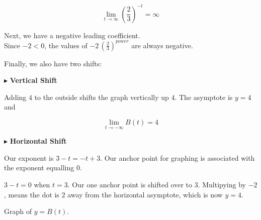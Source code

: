 \documentclass{ximera}
\begin{document}
\begin{example}
\begin{explanation}
\begin{model}
\[ \lim\limits_{t \to \infty} \left( \frac{2}{3} \right)^{-t} = \infty \]








\end{model}

Next, we have a negative leading coefficient. \\

Since $-2 < 0$, the values of $-2 \, \left( \frac{2}{3} \right)^{power}$ are always negative.



Finally, we also have two shifts:



$\blacktriangleright$ \textbf{\textcolor{blue!55!black}{Vertical Shift}} 

Adding $4$ to the outside shifts the graph vertically up $4$.  The asymptote is $y = 4$ and 

\[ \lim\limits_{t \to -\infty} B(t) = 4 \]




$\blacktriangleright$ \textbf{\textcolor{blue!55!black}{Horizontal Shift}} 

Our exponent is $3 - t = -t + 3$.  Our anchor point for graphing is associated with the exponent equalling $0$.



$3-t=0$ when $t=3$. Our one anchor point is shifted over to $3$.  Multipying by $-2$, means the dot is $2$ away from the horizontal asymptote, which is now $y=4$.










Graph of $y = B(t)$.

\begin{image}
\end{image}
\end{explanation}
\end{example}
\end{document}
